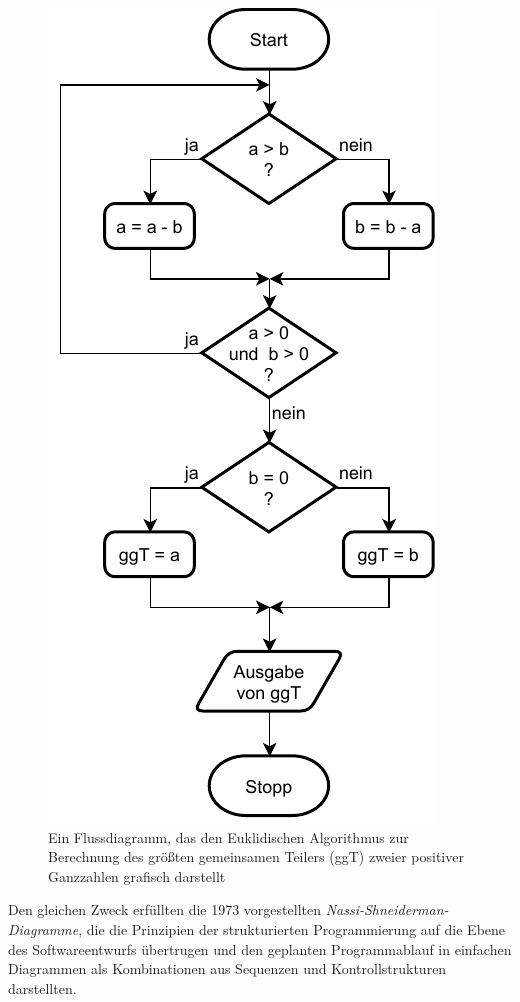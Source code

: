 \begin{figure}[h!]
    \centering
    \includegraphics[scale=0.9]{Bilder/Kapitel-1/Abb-1-4.pdf}
    \vspace{\baselineskip} %
    \caption[Der Euklidische Algorithmus als Flussdiagramm]{Ein Flussdiagramm, das den Euklidischen Algorithmus zur Berechnung des größten gemeinsamen Teilers (ggT) zweier positiver Ganzzahlen grafisch darstellt}
    \label{fig:flussdiagramm}
\end{figure}

\pagebreak %

Den gleichen Zweck erfüllten die 1973 vorgestellten 
\textit{Nassi-Shneiderman-Diagramme}, die die Prinzipien der strukturierten Programmierung auf die Ebene des Softwareentwurfs übertrugen und den geplanten Programmablauf in einfachen Diagrammen als Kombinationen aus Sequenzen und Kontrollstrukturen darstellten.


